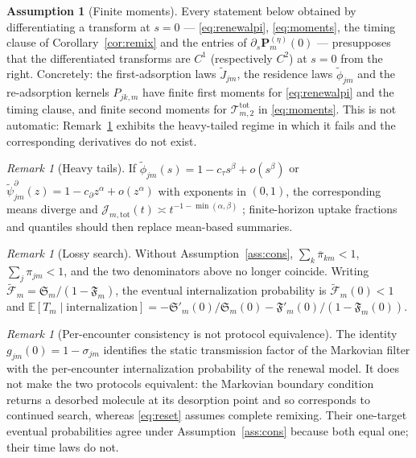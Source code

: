 \documentclass[pdflatex,sn-mathphys-num]{sn-jnl}
\numberwithin{equation}{section}
\theoremstyle{thmstyleone}%
\theoremstyle{definition}
\newtheorem{assumption}[theorem]{Assumption}
\theoremstyle{remark}
\newtheorem{remark}[theorem]{Remark}
\begin{document}
\begin{assumption}[Finite moments]\label{ass:moments}
Every statement below obtained by differentiating a transform at $s=0$ --- \eqref{eq:renewalpi}, \eqref{eq:moments}, the timing clause of Corollary~\ref{cor:remix} and the entries of $\partial_s\mathbf P^{(\eta)}_m(0)$ --- presupposes that the differentiated transforms are $C^1$ (respectively $C^2$) at $s=0$ from the right. Concretely: the first-adsorption laws $\widetilde J_{jm}$, the residence laws $\widetilde\phi_{jm}$ and the re-adsorption kernels $P_{jk,m}$ have finite first moments for \eqref{eq:renewalpi} and the timing clause, and finite second moments for $\mathcal T^{\mathrm{tot}}_{m,2}$ in \eqref{eq:moments}. This is not automatic: Remark~\ref{rem:tails} exhibits the heavy-tailed regime in which it fails and the corresponding derivatives do not exist.
\end{assumption}
\begin{remark}[Heavy tails]\label{rem:tails}
If $\widetilde\phi_{jm}(s)=1-c_\tau s^\beta+o(s^\beta)$ or $\widetilde\psi^\partial_{jm}(z)=1-c_\partial z^\alpha+o(z^\alpha)$ with exponents in $(0,1)$, the corresponding means diverge and $\mathcal J_{m,\mathrm{tot}}(t)\asymp t^{-1-\min(\alpha,\beta)}$ \cite{bressloff2025diffusion,yu2026pattern}; finite-horizon uptake fractions and quantiles should then replace mean-based summaries.
\end{remark}
\begin{remark}[Lossy search]\label{rem:lossy}
Without Assumption~\ref{ass:cons}, $\sum_k\overline\pi_{km}<1$, $\sum_j\pi_{jm}<1$, and the two denominators above no longer coincide. Writing $\widetilde{\mathcal F}_m=\mathfrak S_m/(1-\mathfrak F_m)$, the eventual internalization probability is $\widetilde{\mathcal F}_m(0)<1$ and $\mathbb E[T_m\mid\text{internalization}]=-\mathfrak S'_m(0)/\mathfrak S_m(0) -\mathfrak F'_m(0)/(1-\mathfrak F_m(0))$.
\end{remark}
\begin{remark}[Per-encounter consistency is not protocol equivalence]
The identity $g_{jm}(0)=1-\sigma_{jm}$ identifies the static transmission factor of the Markovian filter with the per-encounter internalization probability of the renewal model. It does not make the two protocols equivalent: the Markovian boundary condition returns a desorbed molecule at its desorption
point and so corresponds to continued search, whereas \eqref{eq:reset} assumes complete remixing. Their one-target eventual probabilities agree under Assumption~\ref{ass:cons} because both equal one; their time laws do not.
\end{remark}
\end{document}
